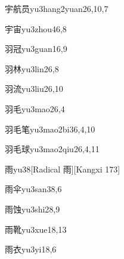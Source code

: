 \begin{verbete}{宇航员}{yu3hang2yuan2}{6,10,7}
\end{verbete}

\begin{verbete}{宇宙}{yu3zhou4}{6,8}
\end{verbete}

\begin{verbete}{羽冠}{yu3guan1}{6,9}
\end{verbete}

\begin{verbete}{羽林}{yu3lin2}{6,8}
\end{verbete}

\begin{verbete}{羽流}{yu3liu2}{6,10}
\end{verbete}

\begin{verbete}{羽毛}{yu3mao2}{6,4}
\end{verbete}

\begin{verbete}{羽毛笔}{yu3mao2bi3}{6,4,10}
\end{verbete}

\begin{verbete}{羽毛球}{yu3mao2qiu2}{6,4,11}
\end{verbete}

\begin{verbete}{雨}{yu3}{8}[Radical 雨][Kangxi 173]
\end{verbete}

\begin{verbete}{雨伞}{yu3san3}{8,6}
\end{verbete}

\begin{verbete}{雨蚀}{yu3shi2}{8,9}
\end{verbete}

\begin{verbete}{雨靴}{yu3xue1}{8,13}
\end{verbete}

\begin{verbete}{雨衣}{yu3yi1}{8,6}
\end{verbete}

